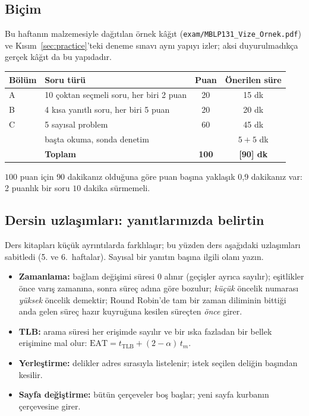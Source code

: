 \documentclass[11pt,a4paper]{article}
\begin{document}
\subsection{Biçim}
Bu haftanın malzemesiyle dağıtılan örnek kâğıt (\texttt{exam/MBLP131\_Vize\_Ornek.pdf}) ve Kısım~\ref{sec:practice}'teki deneme sınavı aynı yapıyı izler; aksi duyurulmadıkça gerçek kâğıt da bu yapıdadır.
\begin{center}
\renewcommand{\arraystretch}{1.25}
\begin{tabular}{@{}llcc@{}}
\toprule
\textbf{Bölüm} & \textbf{Soru türü} & \textbf{Puan} & \textbf{Önerilen süre} \\
\midrule
A & 10 çoktan seçmeli soru, her biri 2 puan & 20 & 15 dk \\
B & 4 kısa yanıtlı soru, her biri 5 puan & 20 & 20 dk \\
C & 5 sayısal problem & 60 & 45 dk \\
 & başta okuma, sonda denetim & & $5 + 5$ dk \\
\midrule
 & \textbf{Toplam} & \textbf{100} & \textbf{[90] dk} \\
\bottomrule
\end{tabular}
\end{center}
$100$ puan için $90$ dakikanız olduğuna göre puan başına yaklaşık 0,9 dakikanız var: 2 puanlık bir soru $10$ dakika sürmemeli.

\subsection{Dersin uzlaşımları: yanıtlarınızda belirtin}
Ders kitapları küçük ayrıntılarda farklılaşır; bu yüzden ders aşağıdaki uzlaşımları sabitledi (5. ve 6.~haftalar). Sayısal bir yanıtın başına ilgili olanı yazın.
\begin{keyidea}
\begin{itemize}[leftmargin=1.2em]
  \item \textbf{Zamanlama:} bağlam değişimi süresi $0$ alınır (geçişler ayrıca sayılır); eşitlikler önce varış zamanına, sonra süreç adına göre bozulur; \emph{küçük} öncelik numarası \emph{yüksek} öncelik demektir; Round Robin'de tam bir zaman diliminin bittiği anda gelen süreç hazır kuyruğuna kesilen süreçten \emph{önce} girer.
  \item \textbf{TLB:} arama süresi her erişimde sayılır ve bir ıska fazladan bir bellek erişimine mal olur: $\text{EAT} = t_{\text{TLB}} + (2-\alpha)\,t_m$.
  \item \textbf{Yerleştirme:} delikler adres sırasıyla listelenir; istek seçilen deliğin başından kesilir.
  \item \textbf{Sayfa değiştirme:} bütün çerçeveler boş başlar; yeni sayfa kurbanın çerçevesine girer.
\end{itemize}
\end{keyidea}
\end{document}
